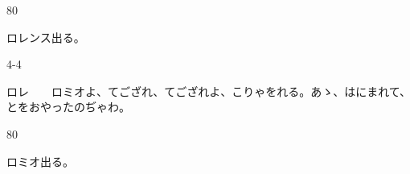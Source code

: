 \documentclass[tate,paper=b6j,jafontsize=9pt]{jlreq}
\begin{document}
\begin{azconvIndented}{8\zw}{0\zw}

ロレンス出る。

\end{azconvIndented}
\begin{azconvIndented}{4\zw}{-4\zw}

ロレ　　ロミオよ、てござれ、てござれよ、こりゃをれる。あゝ、はにまれて、とをおやったのぢゃわ。

\end{azconvIndented}
\begin{azconvIndented}{8\zw}{0\zw}

ロミオ出る。

\end{azconvIndented}
\end{document}
